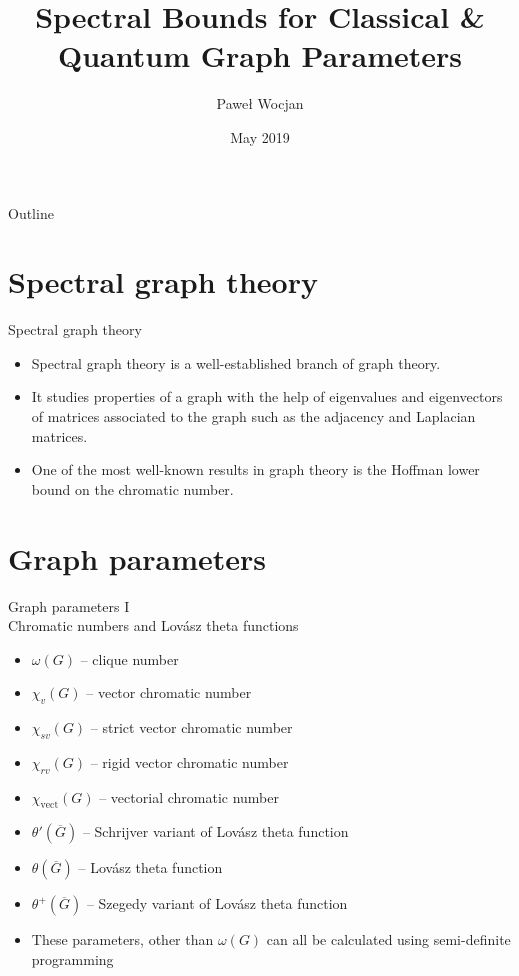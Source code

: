 \documentclass{beamer}
\title[Spectral Bounds]{Spectral Bounds for Classical \& Quantum Graph Parameters}
\author{Pawe{\l} Wocjan}
\institute{University of Central Florida}
\date{May 2019}
\renewcommand{\>}{\rangle}
\newcommand{\<}{\langle}
\begin{document}
\begin{frame}
  \titlepage
\end{frame}

\begin{frame}{Outline}
  \tableofcontents
\end{frame}

\section{Spectral graph theory}

\begin{frame}{Spectral graph theory}
\begin{itemize}
\item Spectral graph theory is a well-established branch of graph theory.

\item It studies properties of a graph with the help of eigenvalues and eigenvectors of matrices associated to the graph such as the adjacency and Laplacian matrices.

\item One of the most well-known results in graph theory is the Hoffman lower bound on the chromatic number.
\end{itemize}
\end{frame}

\section{Graph parameters}

\begin{frame}{Graph parameters I \\ Chromatic numbers and Lov\'asz theta functions}
\begin{itemize}
\item $\omega(G)$ -- clique number
\item $\chi_v(G)$ -- vector chromatic number
\item $\chi_{sv}(G)$ -- strict vector chromatic number
\item $\chi_{rv}(G)$ -- rigid vector chromatic number
\item $\chi_{\mathrm{vect}}(G)$ -- vectorial chromatic number

\medskip
\item $\theta'(\overline{G})$  -- Schrijver variant of Lov\'asz theta function
\item $\theta(\overline{G})$ -- Lov\'asz theta function 
\item $\theta^+(\overline{G})$ -- Szegedy variant of Lov\'asz theta function 

\medskip
\item These parameters, other than $\omega(G)$ can all be calculated using semi-definite programming
\end{itemize}
\end{frame}
\end{document}
